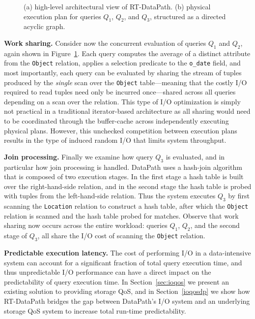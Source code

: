 \documentclass{sig-alternate}
\begin{document}
\begin{figure}[ht]
{ \label{fig:datapath_dag}
}
\caption{(a) high-level architectural view of RT-DataPath. (b) physical
execution plan for queries $Q_1$, $Q_2$, and $Q_3$, structured as a directed
acyclic graph.\\}
\end{figure}

{\bf Work sharing.} Consider now the concurrent evaluation of queries $Q_1$
and $Q_2$, again shown in Figure~\ref{fig:datapath_dag}. Each query computes
the average of a distinct attribute from the \texttt{Object} relation, applies
a selection predicate to the \texttt{o\_date} field, and most importantly,
each query can be evaluated by sharing the stream of tuples produced by the
\emph{single} scan over the \texttt{Object} table---meaning that the costly
I/O required to read tuples need only be incurred once---shared across all
queries depending on a scan over the relation.  This type of I/O optimization
is simply not practical in a traditional iterator-based architecture as all
sharing would need to be coordinated through the buffer-cache across
independently executing physical plans. However, this unchecked competition
between execution plans results in the type of induced random I/O that limits
system throughput.

{\bf Join processing.} Finally we examine how query $Q_3$ is evaluated, and in
particular how join processing is handled.  DataPath uses a hash-join
algorithm that is composed of two execution stages.  In the first stage a hash
table is built over the right-hand-side relation, and in the second stage the
hash table is probed with tuples from the left-hand-side relation. Thus the
system executes $Q_3$ by first scanning the \texttt{Location} relation to
construct a hash table, after which the \texttt{Object} relation is scanned
and the hash table probed for matches. Observe that work sharing now occurs
across the entire workload: queries $Q_1$, $Q_2$, and the second stage of
$Q_3$, all share the I/O cost of scanning the \texttt{Object} relation.

{\bf Predictable execution latency.} The cost of performing I/O in a
data-intensive system can account for a significant fraction of total query
execution time, and thus unpredictable I/O performance can have a direct
impact on the predictability of query execution time. In
Section~\ref{sec:ioqos} we present an existing solution to providing storage
QoS, and in Section~\ref{ioqosdp} we show how RT-DataPath bridges the gap
between DataPath's I/O system and an underlying storage QoS system to increase
total run-time predictability.
\end{document}
